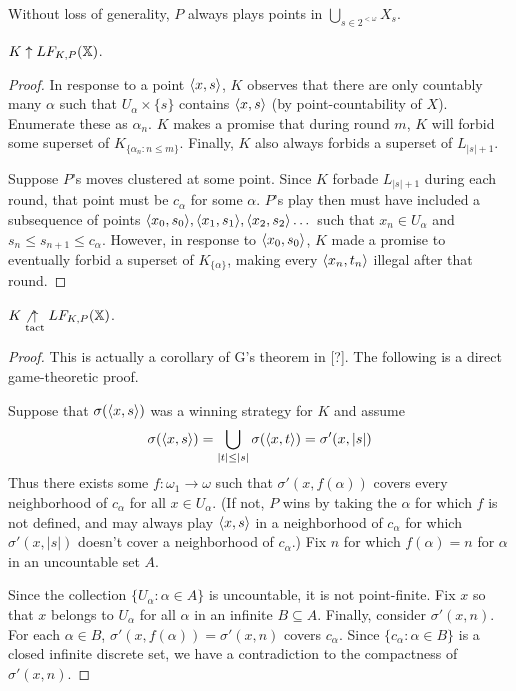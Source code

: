 \begin{prop}
Without loss of generality, $P$ always plays points in $\bigcup_{s \in 2^{<\omega}} X_s$.
\end{prop}

\begin{prop}
$K \uparrow LF_{K,P}(\mathbb{X})$.
\end{prop}

\begin{proof}
In response to a point $\langle x,s\rangle$, $K$ observes that there are only countably many $\alpha$ such that $U_\alpha \times \{s\}$ contains $\langle x,s\rangle$ (by point-countability of $X$). Enumerate these as $\alpha_n$. $K$ makes a promise that during round $m$, $K$ will forbid some superset of $K_{\{\alpha_n : n\leq m\}}$. Finally, $K$ also always forbids a superset of $L_{|s|+1}$.

Suppose $P$'s moves clustered at some point. Since $K$ forbade $L_{|s|+1}$ during each round, that point must be $c_\alpha$ for some $\alpha$. $P$'s play then must have included a subsequence of points $\langle x_0,s_0\rangle,\langle x_1,s_1\rangle,\langle x_2,s_2\rangle\dots$ such that $x_n \in U_\alpha$ and $s_n \leq s_{n+1} \leq c_\alpha$. However, in response to $\langle x_0,s_0\rangle$, $K$ made a promise to eventually forbid a superset of $K_{\{\alpha\}}$, making every $\langle x_n,t_n\rangle$ illegal after that round.
\end{proof}

\begin{thm}
$K\not\underset{\text{tact}}{\uparrow}LF_{K,P}(\mathbb{X})$.
\end{thm}

\begin{proof}
This is actually a corollary of G's theorem in [?]. The following is a direct game-theoretic proof.

Suppose that $\sigma(\langle x,s\rangle)$ was a winning strategy for $K$ and assume 
  \[
    \sigma(\langle x,s\rangle) = \bigcup_{|t|\leq |s|} \sigma(\langle x,t\rangle) = \sigma'(x,|s|)
  \]
Thus there exists some $f: \omega_1 \to \omega$ such that $\sigma'(x,f(\alpha))$ covers every neighborhood of $c_\alpha$ for all $x\in U_\alpha$. (If not, $P$ wins by taking the $\alpha$ for which $f$ is not defined, and may always play $\langle x,s\rangle$ in a neighborhood of $c_\alpha$ for which $\sigma'(x,|s|)$ doesn't cover a neighborhood of $c_\alpha$.) Fix $n$ for which $f(\alpha)=n$ for $\alpha$ in an uncountable set $A$.

Since the collection $\{U_\alpha : \alpha \in A\}$ is uncountable, it is not point-finite. Fix $x$ so that $x$ belongs to $U_\alpha$ for all $\alpha$ in an infinite $B \subseteq A$. Finally, consider $\sigma'(x,n)$. For each $\alpha\in B$, $\sigma'(x,f(\alpha))=\sigma'(x,n)$ covers $c_\alpha$. Since $\{c_\alpha : \alpha \in B\}$ is a closed infinite discrete set, we have a contradiction to the compactness of $\sigma'(x,n)$.
\end{proof}



